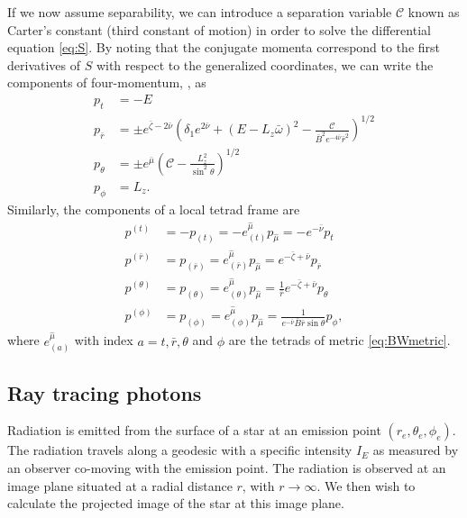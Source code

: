 \documentclass[iop, usenatbib]{emulateapj}
\makeatletter
\def\fvec#1{\underline{\sbox\tw@{$#1$}\dp\tw@\z@\box\tw@}}
\newcommand{\Ca}{\ensuremath{\mathcal{C}}}
\newcommand{\rb}{\ensuremath{\bar{r}}}
\newcommand{\wb}{\ensuremath{\bar{\omega}}}
\newcommand{\nub}{\ensuremath{\bar{\nu}}}
\newcommand{\zetab}{\ensuremath{\bar{\zeta}}}
\newcommand{\Bb}{\ensuremath{\bar{B}}}
\newcommand{\mub}{\ensuremath{\bar{\mu}}}
\makeatother
\begin{document}
If we now assume separability, we can introduce a separation variable $\Ca$ known as Carter's constant (third constant of motion) in order to solve the differential equation \eqref{eq:S}.  
By noting that the conjugate momenta correspond to the first derivatives of $S$ with respect to the generalized coordinates, we can write the components of four-momentum, \fvec{p}, as 
\begin{align}
  p_t        &= -E \label{eq:p_t}\\
  p_{\rb}    &= \pm e^{\zetab - 2\nub} \left( \delta_1 e^{2\nub} + (E - L_z \wb)^2 - \frac{\Ca}{\Bb^2 e^{-4\nub} \rb^2} \right)^{1/2}\label{eq:p_r}\\
  p_{\theta} &= \pm e^{\mub} \left( \Ca - \frac{L_z^2}{\sin^2\theta} \right)^{1/2}\label{eq:p_the}\\
  p_{\phi}   &= L_z\label{eq:p_p}.
\end{align}
Similarly, the components of a local tetrad frame are
\begin{align}
  p^{(t)} &= -p_{(t)} = -e_{(t)}^{\hat{\mu}} p_{\hat{\mu}} = -e^{-\nub}p_t \label{eq:tetp_t}\\
  p^{(\rb)} &= p_{(\rb)} = e_{(\rb)}^{\hat{\mu}} p_{\hat{\mu}} = e^{-\zetab + \nub} p_{\rb} \label{eq:tetp_r}\\
  p^{(\theta)} &= p_{(\theta)} = e_{(\theta)}^{\hat{\mu}} p_{\hat{\mu}} = \frac{1}{\rb} e^{-\zetab+\nub} p_{\theta} \label{eq:tetp_theta}\\
  p^{(\phi)} &= p_{(\phi)} = e_{(\phi)}^{\hat{\mu}} p_{\hat{\mu}} = \frac{1}{e^{-\nub} \Bb \rb \sin\theta} p_{\phi} \label{eq:tetp_phi},
\end{align}
where $e^{\hat{\mu}}_{(a)}$ with index $a = t, \rb, \theta$ and $\phi$ are the tetrads of metric \eqref{eq:BWmetric}.


\subsection{Ray tracing photons}
Radiation is emitted from the surface of a star at an emission point $(r_e,\theta_e,\phi_e)$.  
The radiation travels along a geodesic with a specific intensity $I_{E}$ as measured by an observer co-moving with the emission point.  
The radiation is observed at an image plane situated at a radial distance $r$, with $r\rightarrow\infty$.  
We then wish to calculate the projected image of the star at this image plane.
\end{document}
